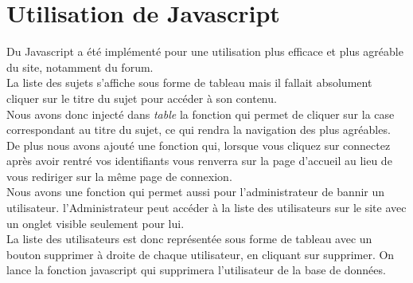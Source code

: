 \documentclass[a4paper, 11pt]{article}
\begin{document}
\section{Utilisation de Javascript}
Du Javascript a été implémenté pour une utilisation plus efficace et plus agréable du site, notamment du forum.\\
La liste des sujets s'affiche sous forme de tableau mais il fallait absolument cliquer sur le titre du sujet pour accéder à son contenu.\\
Nous avons donc injecté dans \textit{table} la fonction qui permet de cliquer sur la case correspondant au titre du sujet, ce qui rendra la navigation des plus agréables.\\
De plus nous avons ajouté une fonction qui, lorsque vous cliquez sur connectez après avoir rentré vos identifiants vous renverra sur la page d'accueil au lieu de vous rediriger sur la même page de connexion.\\
Nous avons une fonction qui permet aussi pour l'administrateur de bannir un utilisateur. l'Administrateur peut accéder à la liste des utilisateurs sur le site avec un onglet visible seulement pour lui.\\
La liste des utilisateurs est donc représentée sous forme de tableau avec un bouton supprimer à droite de chaque utilisateur, en cliquant sur supprimer. On lance la fonction javascript qui supprimera l'utilisateur de la base de données.
\end{document}
